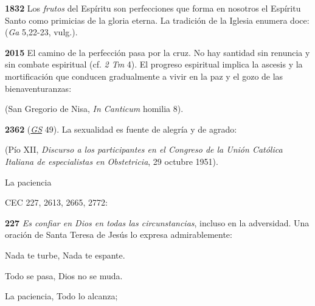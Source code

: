 \begin{body}
\begin{body}
\textbf{1832} Los \emph{frutos} del Espíritu son perfecciones que forma en nosotros el Espíritu Santo como primicias de la gloria eterna. La tradición de la Iglesia enumera doce:  (\emph{Ga} 5,22-23, vulg.).

\textbf{2015} El camino de la perfección pasa por la cruz. No hay santidad sin renuncia y sin combate espiritual (cf. \emph{2 Tm} 4). El progreso espiritual implica la ascesis y la mortificación que conducen gradualmente a vivir en la paz y el gozo de las bienaventuranzas:

 (San Gregorio de Nisa, \emph{In Canticum} homilia 8).

\textbf{2362}  (\href{http://www.vatican.va/archive/hist_councils/ii_vatican_council/documents/vat-ii_const_19651207_gaudium-et-spes_sp.html}{\emph{GS}} 49). La sexualidad es fuente de alegría y de agrado:

 (Pío XII, \emph{Discurso a los participantes en el Congreso de la Unión Católica Italiana de especialistas en Obstetricia}, 29 octubre 1951).

La paciencia

CEC 227, 2613, 2665, 2772:

\textbf{227} \emph{Es confiar en Dios en todas las circunstancias}, incluso en la adversidad. Una oración de Santa Teresa de Jesús lo expresa admirablemente:

Nada te turbe, Nada te espante.

Todo se pasa, Dios no se muda.

La paciencia, Todo lo alcanza;


\end{body}
\end{body}
